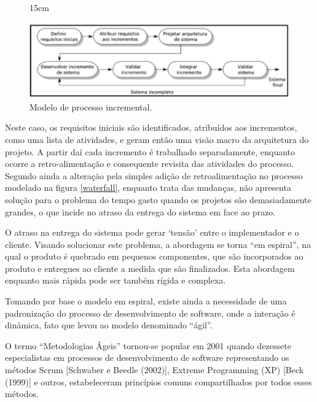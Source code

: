 \begin{figure}[!ht]{15cm}
  \caption{Modelo de processo incremental.} \label{integracao}
  \includegraphics[width=1\hsize]{figuras/integracao.png}
\end{figure}

Neste caso, os requisitos iniciais são identificados, atribuídos aos incrementos, como uma lista de atividades, e geram então uma visão macro da arquitetura do projeto. A partir daí cada incremento é trabalhado separadamente, enquanto ocorre a retro-alimentação e consequente revisita das atividades do processo. Segundo ainda  a alteração pela simples adição de retroalimentação no processo modelado na figura \ref{waterfall}, enquanto trata das mudanças, não apresenta solução para o problema do tempo gasto quando os projetos são demasiadamente grandes, o que incide no atraso da entrega do sistema em face ao prazo. 

O atraso na entrega do sistema pode gerar `tensão' entre o implementador e o cliente. Visando solucionar este problema, a abordagem se torna ``em espiral'', na qual o produto é quebrado em pequenos componentes, que são incorporados ao produto e entregues ao cliente a medida que são finalizados. Esta abordagem enquanto mais rápida pode ser também rígida e complexa.

Tomando por base o modelo em espiral, existe ainda a necessidade de uma padronização do processo de desenvolvimento de software, onde a interação é dinâmica, fato que levou ao modelo denominado ``ágil''.

\begin{citacao}
O termo “Metodologias Ágeis” tornou-se popular em 2001 quando dezessete especialistas em processos de desenvolvimento de software representando os métodos Scrum [Schwaber e Beedle (2002)], Extreme Programming (XP) [Beck (1999)] e outros, estabeleceram princípios comuns compartilhados por todos esses métodos.\cite[p.3]{dos2004comparaccao}
\end{citacao}

